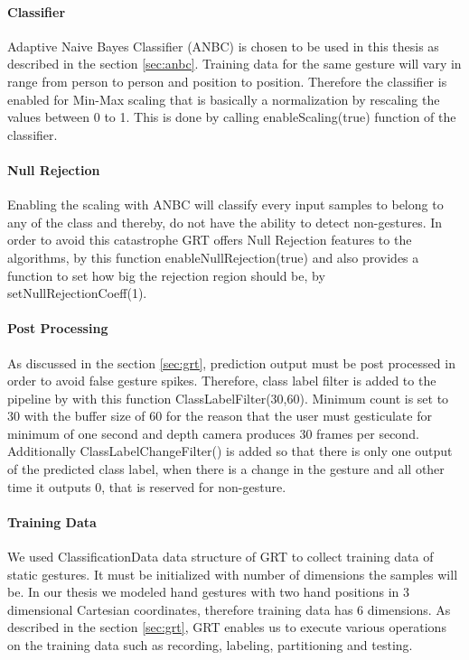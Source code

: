 \paragraph*{Classifier} Adaptive Naive Bayes Classifier (ANBC) is chosen to be used in this thesis as described in the section \ref{sec:anbc}. Training data for the same gesture will vary in range from person to person and position to position. Therefore the classifier is enabled for Min-Max scaling that is basically a normalization by rescaling the values between 0 to 1.  This is done by calling enableScaling(true) function of the classifier.

\paragraph*{Null Rejection} Enabling the scaling with ANBC will classify every input samples to belong to any of the class and thereby, do not have the ability to detect non-gestures. In order to avoid this catastrophe GRT offers Null Rejection features to the algorithms, by this function enableNullRejection(true) and also provides a function to set how big the rejection region should be, by setNullRejectionCoeff(1).

\paragraph*{Post Processing} As discussed in the section \ref{sec:grt}, prediction output must be post processed in order to avoid false gesture spikes. Therefore, class label filter is added to the pipeline by with this function ClassLabelFilter(30,60). Minimum count is set to 30 with the buffer size of 60 for the reason that the user must gesticulate for minimum of one second and depth camera produces 30 frames per second. Additionally  ClassLabelChangeFilter() is added so that there is only one output of the predicted class label, when there is a change in the gesture and all other time it outputs 0, that is reserved for non-gesture.

\paragraph*{Training Data} We used ClassificationData data structure of GRT to collect training data of static gestures. It must be initialized with number of dimensions the samples will be. In our thesis we modeled hand gestures with two hand positions in 3 dimensional Cartesian coordinates, therefore training data has 6 dimensions.
As described in the section \ref{sec:grt}, GRT enables us to execute various operations on the training data such as recording, labeling, partitioning and testing.  

